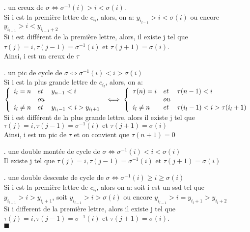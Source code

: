 				\begin{itemize}
					\item[.] un creux de $\sigma \iff \sigma^{-1}(i) >i <\sigma(i) $.\\ 
					Si i est la première lettre de $c_{i_{l}}$, alors, on a: $y_{i_{l-1}}>i<\sigma(i)$ ou encore $y_{i_{l-1}}>i<y_{i_{l-1}+2}$ \\
					Si i est différent de la première lettre, alors, il existe j tel que\\
					$\tau(j)=i,\tau(j-1)=\sigma^{-1}(i) \text{ et } \tau(j+1)=\sigma(i) $.\\
					Ainsi, i est un creux de $\tau$
					\item[.] un pic de cycle de $\sigma \iff \sigma^{-1}(i) <i>\sigma(i)$\\
					Si i est la plus grande lettre de  $c_{i_{l}}$, alors, on a:\\
					$
						\left\{
							\begin{array}{l l l}
								i_{l}=n &et& y_{n-1}<i\\
								&ou&\\
								i_{l}\neq n &et& y_{i_{l}-1}<i>y_{i_{l}+1}
							\end{array}
						\right.
						\iff \left \{
							\begin{array}{l l l}
								\tau(n) = i &et& \tau(n-1)<i\\
								&ou&\\
								i_{l}\neq n &et& \tau(i_{l}-1)<i>\tau(i_{l}+1)
							\end{array}
						\right.
					$\\
					Si i est différent de la plus grande lettre, alors il existe j tel que\\
					$\tau(j)=i,\tau(j-1)=\sigma^{-1}(i) \text{ et }\tau(j+1)=\sigma(i) $\\
					Ainsi, i est un pic de $\tau$ et on convient que $ \tau(n+1)=0 $
					\item[.] une double montée de cycle de $\sigma \iff \sigma^{-1}(i)<i<\sigma(i) $\\
					Il existe j tel que $\tau(j)=i, \tau(j-1)=\sigma^{-1}(i) \text{ et } \tau(j+1)=\sigma(i) $
					\item[.] une double descente de cycle de $\sigma \iff \sigma^{-1}(i)\geq i \geq \sigma(i) $\\
					Si i est la première lettre de $c_{i_{l}}$, alors on a: soit i est un ssd tel que $y_{i_{l-1}}>i>y_{i_{l}+1}$, soit $y_{i_{l-1}}>i>\sigma(i)$ ou encore $y_{i_{l-1}}>i=y_{i_{l}+1}>y_{i_{l}+2}$\\
					Si i different de la première lettre, alors il existe j tel que \\
					$ \tau(j)=i,\tau(j-1)=\sigma^{-1}(i) \text{ et } \tau(j+1)=\sigma(i) $.\\$\blacksquare$
				\end{itemize}

